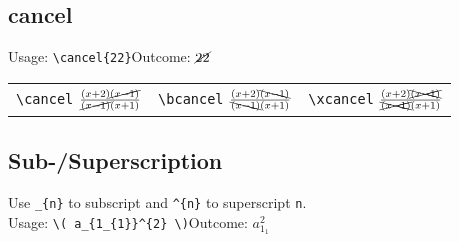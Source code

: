\documentclass[draft]{cheatsht}
\begin{document}
\subsection{cancel}
Usage: \verb!\cancel{22}!\hspace{1.5cm}Outcome: \(\cancel{22}\)\vspace{4pt}\\
\begin{tabular}{@{}lll@{}}
  \verb!\cancel!  \(\frac{(x+2)\cancel{(x-1)}}{\cancel{(x-1)}(x+1)}\) &
  \verb!\bcancel! \(\frac{(x+2)\bcancel{(x-1)}}{\bcancel{(x-1)}(x+1)}\) &
  \verb!\xcancel! \(\frac{(x+2)\xcancel{(x-1)}}{\xcancel{(x-1)}(x+1)}\)
\end{tabular}

\subsection{Sub-/Superscription}
Use \verb!_{n}! to subscript and \verb!^{n}! to superscript \verb!n!.\\
Usage: \verb!\( a_{1_{1}}^{2} \)!\hspace{1.5cm}Outcome: \( a_{1_{1}}^{2}\)
\end{document}
